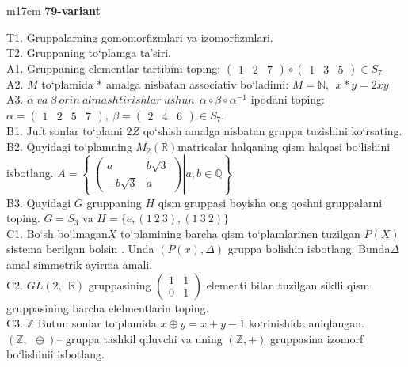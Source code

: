 \documentclass{article}
\begin{document}
\begin{tabular}{m{17cm}}
\textbf{79-variant}
\newline

T1. Gruppalarning gomomorfizmlari va izomorfizmlari. \\
T2. Gruppaning to`plamga ta'siri. \\
A1. Gruppaning elementlar tartibini toping: \(\begin{pmatrix}
1 & 2 & 7
\end{pmatrix} \circ \begin{pmatrix}
1 & 3 & 5
\end{pmatrix} \in S_{7}\) \\
A2. \(M\) to`plamida * amalga nisbatan associativ bo`ladimi: \(M\mathbb{= N},\ \ x*y = 2xy\) \\
A3. \(\alpha\ va\ \beta\ orin\ almashtirishlar\ ushun\ \ \alpha \circ \beta \circ \alpha^{- 1}\) ipodani toping:\(\alpha = \begin{pmatrix}
1 & 2 & 5 & 7
\end{pmatrix},\ \beta = \begin{pmatrix}
2 & 4 & 6
\end{pmatrix} \in S_{7}\). \\
B1. Juft sonlar to`plami \(2Z\) qo`shish amalga nisbatan gruppa tuzishini ko`rsating. \\
B2. Quyidagi to`plamning \(M_{2}(\mathbb{R})\)matricalar halqaning qism halqasi bo`lishini isbotlang. \(A = \left\{ \left. \ \begin{pmatrix}
a & b\sqrt{3} \\
 - b\sqrt{3} & a
\end{pmatrix} \right|a,b\mathbb{\in Q} \right\}\) \\
B3. Quyidagi \(G\) gruppaning \(H\) qism gruppasi boyisha o\textquotesingle ng qo\textquotesingle shni gruppalarni toping. \(G = S_{3}\) va \(H = \{ e,(1\ 2\ 3),(1\ 3\ 2)\}\) \\
C1. Bo`sh bo`lmagan\(X\) to`plamining barcha qism to`plamlarinen tuzilgan \(P(X)\) sistema berilgan bo\textquotesingle lsin . Unda \((P(x),\Delta)\) gruppa bolishin isbotlang. Bunda\(\Delta\) amal simmetrik ayirma amali. \\
C2. \(GL(2,\mathbb{\ \ R})\) gruppasining \(\begin{pmatrix}
1 & 1 \\
0 & 1
\end{pmatrix}\) elementi bilan tuzilgan siklli qism gruppasining barcha elelmentlarin toping. \\
C3. \(\mathbb{Z}\) Butun sonlar to`plamida \(x \oplus y = x + y - 1\) ko`rinishida aniqlangan. \((\mathbb{Z},\ \  \oplus )\)-- gruppa tashkil qiluvchi va uning \((\mathbb{Z}, + )\) gruppasina izomorf bo`lishinii isbotlang. \\

\end{tabular}
\vspace{1cm}
\end{document}
